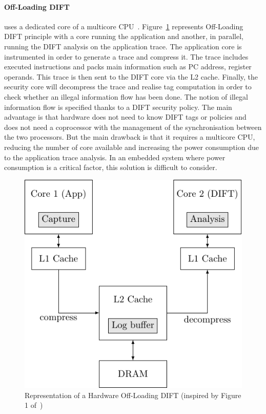 \paragraph{Off-Loading DIFT} uses a dedicated core of a multicore CPU~\cite{CKSFGMRRRV-08-sigarch,VHYR-08-cca,RGMRCKR-08-spaa}. Figure~\ref{fig:offloading_dift} represents Off-Loading DIFT principle with a core running the application and another, in parallel, running the DIFT analysis on the application trace. The application core is instrumented in order to generate a trace and compress it. The trace includes executed instructions and packs main information such as PC address, register operands. This trace is then sent to the DIFT core via the L2 cache. Finally, the security core will decompress the trace and realise tag computation in order to check whether an illegal information flow has been done. The notion of illegal information flow is specified thanks to a DIFT security policy.
The main advantage is that hardware does not need to know DIFT tags or policies and does not need a coprocessor with the management of the synchronisation between the two processors.  But the main drawback is that it requires a multicore CPU, reducing the number of core available and increasing the power consumption due to the application trace analysis. In an embedded system where power consumption is a critical factor, this solution is difficult to consider.

\begin{figure}[ht]
    \centering
    \includegraphics{c2_soa/img/offloading.pdf}
    \caption{Representation of a Hardware Off-Loading DIFT (inspired by Figure 1 of~\cite{KDK-09-dsn})}
    \label{fig:offloading_dift}
\end{figure}

